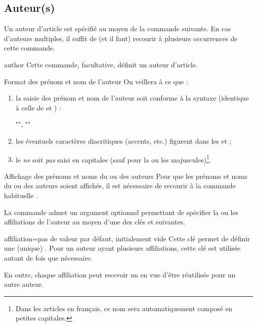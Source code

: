 \subsection{Auteur(s)}
\label{sec-auteurs}

Un auteur d'article est spécifié au moyen de la commande 
suivante. En cas d'auteurs multiples, il suffit de (et il faut) recourir
à plusieurs occurrences de cette commande.

\begin{docCommand}{author}{}
  Cette commande, facultative, définit un auteur d'article.
\end{docCommand}
%
\begin{dbwarning}{Format des prénom et nom de l'auteur}{}
  On veillera à ce que :
  \begin{enumerate}
  \item la saisie des prénom et nom de l'auteur soit conforme à la syntaxe
    (identique à celle de  et ) :
\begin{bodycode}[listing options={showspaces}]
"", ""
\end{bodycode}
  \item les éventuels caractères diacritiques (accents, etc.) figurent dans les
     et  ;
  \item le  \emph{ne} soit \emph{pas} saisi en capitales (sauf pour la
    ou les majuscules)\footnote{Dans les articles en français, ce nom sera
      automatiquement composé en petites capitales.}.
  \end{enumerate}
\end{dbwarning}

\begin{dbremark}{Affichage des prénoms et noms du ou des auteurs}{}
  Pour que les prénoms et noms du ou des auteurs soient affichés, il est
  nécessaire de recourir à la commande habituelle .
\end{dbremark}

La commande  admet un argument optionnel permettant de spécifier
la ou les affiliations de l'auteur au moyen d'une des clés 
et  suivantes.

\begin{docKey}{affiliation}{={}}{pas de valeur par défaut,
    initialement vide}
  Cette clé permet de définir une (unique) . Pour un auteur
  ayant plusieurs affiliations, cette clé est utilisée autant de fois que
  nécessaire.

  En outre, chaque affiliation peut recevoir un  en vue d'être
  réutilisée pour un autre auteur.
\end{docKey}

